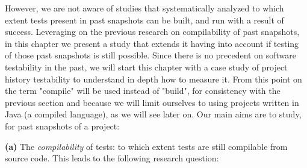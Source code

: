 

However, we are not aware of studies that systematically analyzed to which extent tests present in past snapshots can be built, and run with a result of success. Leveraging on the previous research on compilability of past snapshots, in this chapter we present a study that extends it having into account if testing of those past snapshots is still possible. 
Since there is no precedent on software testability in the past, we will start this chapter with a case study of project history testability to understand in depth how to measure it.
From this point on the term "compile" will be used instead of "build", for consistency with the previous section and because we will limit ourselves to using  projects written in Java (a compiled language), as we will see later on.
Our main aims are to study, for past snapshots of a project:


\textbf{(a)} The \textit{compilability} of tests: to which extent tests are still compilable from source code. 
This leads to the following research question:

